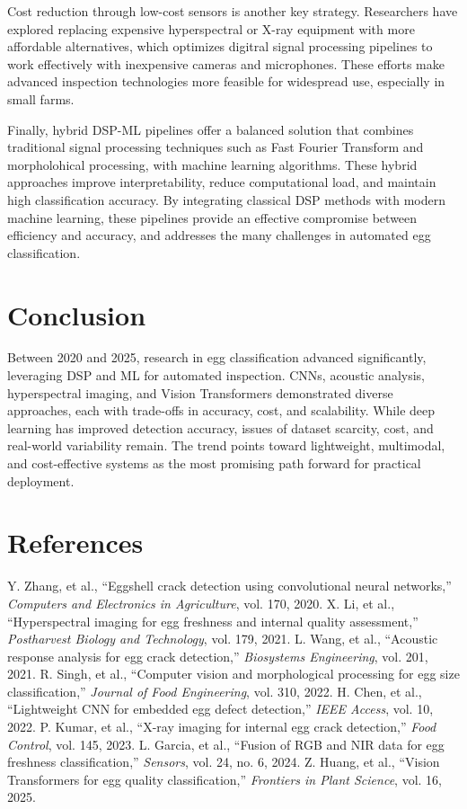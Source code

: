 \documentclass[conference]{IEEEtran}
\begin{document}
	Cost reduction through low-cost sensors is another key strategy. Researchers have explored replacing expensive hyperspectral or X-ray equipment with more affordable alternatives, which optimizes digitral signal processing pipelines to work effectively with inexpensive cameras and microphones. These efforts make advanced inspection technologies more feasible for widespread use, especially in small farms.

	Finally, hybrid DSP-ML pipelines offer a balanced solution that combines traditional signal processing techniques such as Fast Fourier Transform and morpholohical processing, with machine learning algorithms. These hybrid approaches improve interpretability, reduce computational load, and maintain high classification accuracy. By integrating classical DSP methods with modern machine learning, these pipelines provide an effective compromise between efficiency and accuracy, and addresses the many challenges in automated egg classification.
	
	\section{Conclusion}
	Between 2020 and 2025, research in egg classification advanced significantly, leveraging DSP and ML for automated inspection. CNNs, acoustic analysis, hyperspectral imaging, and Vision Transformers demonstrated diverse approaches, each with trade-offs in accuracy, cost, and scalability. While deep learning has improved detection accuracy, issues of dataset scarcity, cost, and real-world variability remain. The trend points toward lightweight, multimodal, and cost-effective systems as the most promising path forward for practical deployment.
	
	\section*{References}
	\begin{thebibliography}{00}
		 Y. Zhang, et al., ``Eggshell crack detection using convolutional neural networks,'' \textit{Computers and Electronics in Agriculture}, vol. 170, 2020.
		 X. Li, et al., ``Hyperspectral imaging for egg freshness and internal quality assessment,'' \textit{Postharvest Biology and Technology}, vol. 179, 2021.
		 L. Wang, et al., ``Acoustic response analysis for egg crack detection,'' \textit{Biosystems Engineering}, vol. 201, 2021.
		 R. Singh, et al., ``Computer vision and morphological processing for egg size classification,'' \textit{Journal of Food Engineering}, vol. 310, 2022.
		 H. Chen, et al., ``Lightweight CNN for embedded egg defect detection,'' \textit{IEEE Access}, vol. 10, 2022.
		 P. Kumar, et al., ``X-ray imaging for internal egg crack detection,'' \textit{Food Control}, vol. 145, 2023.
		 L. Garcia, et al., ``Fusion of RGB and NIR data for egg freshness classification,'' \textit{Sensors}, vol. 24, no. 6, 2024.
		 Z. Huang, et al., ``Vision Transformers for egg quality classification,'' \textit{Frontiers in Plant Science}, vol. 16, 2025.
	\end{thebibliography}
	
\end{document}
